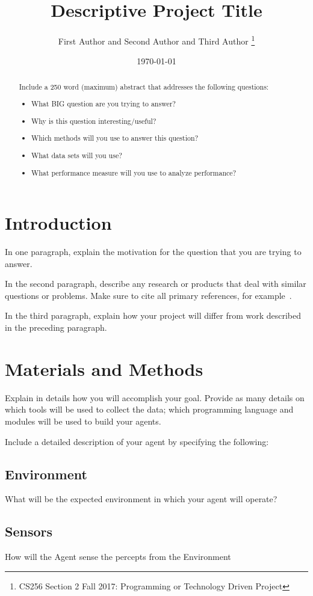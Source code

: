 \documentclass{article}
\title{Descriptive Project Title}
\author{First Author and Second Author and Third Author
\thanks{CS256 Section 2 Fall 2017: Programming or Technology Driven Project}}
\date{\today}
\begin{document}
\maketitle

\begin{abstract}
Include a 250 word (maximum) abstract that addresses the following questions:
\begin{itemize}
\item What BIG question are you trying to answer?
\item Why is this question interesting/useful?
\item Which methods will you use to answer this question?
\item What data sets will you use?
\item What performance measure will you use to analyze performance?
\end{itemize}
\end{abstract}

\section{Introduction}

In one paragraph, explain the motivation for the question that you are trying to answer. 

In the second paragraph, describe any research or products that deal with similar questions or problems.  Make sure to cite all primary references, for example~\cite{einstein}.

In the third paragraph, explain how your project will differ from work described in the preceding paragraph. 

\section{Materials and Methods}
Explain in details how you will accomplish your goal.  Provide as many details on which tools will be used to collect the data; which programming language and modules will be used to build your agents.

Include a detailed description of your agent by specifying the following:
\subsection{Environment}
What will be the expected environment in which your agent will operate?
\subsection{Sensors}
How will the Agent sense the percepts from the Environment
\end{document}
